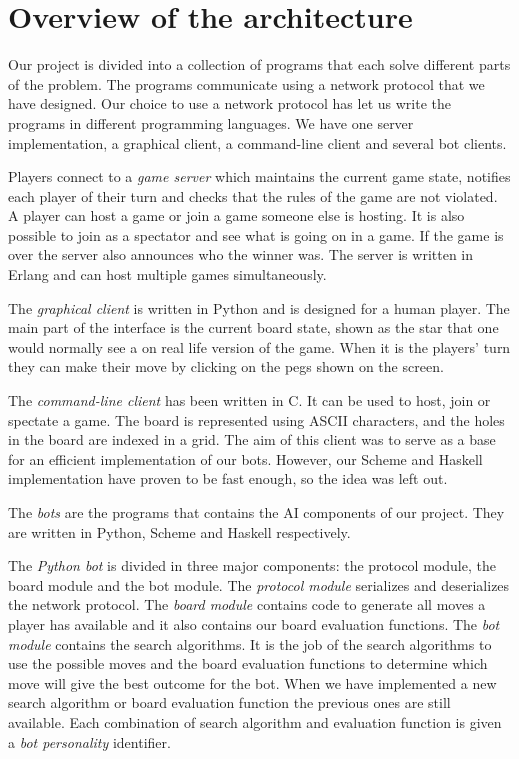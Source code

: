 \section{Overview of the architecture}

Our project is divided into a collection of programs that each solve
different parts of the problem. The programs communicate using a
network protocol that we have designed. Our choice to use a network
protocol has let us write the programs in different programming
languages. We have one server implementation, a graphical client, a
command-line client and several bot clients.

Players connect to a \emph{game server} which maintains the current
game state, notifies each player of their turn and checks that the
rules of the game are not violated. A player can host a game or join a
game someone else is hosting. It is also possible to join as a
spectator and see what is going on in a game. If the game is over the
server also announces who the winner was. The server is written in
Erlang and can host multiple games simultaneously.

The \emph{graphical client} is written in Python and is designed for a
human player. The main part of the interface is the current board
state, shown as the star that one would normally see a on real life
version of the game. When it is the players' turn they can make their
move by clicking on the pegs shown on the screen.

The \emph{command-line client} has been written in C. It can be used to
host, join or spectate a game. The board is represented using ASCII
characters, and the holes in the board are indexed in a grid. The aim
of this client was to serve as a base for an efficient implementation of
our bots. However, our Scheme and Haskell implementation have proven to
be fast enough, so the idea was left out.

The \emph{bots} are the programs that contains the AI components of our
project. They are written in Python, Scheme and Haskell respectively.

The \emph{Python bot} is divided in three major components: the protocol
module, the board module and the bot module. The \emph{protocol module}
serializes and deserializes the network protocol. The \emph{board module}
contains code to generate all moves a player has available and it also
contains our board evaluation functions. The \emph{bot module} contains
the search algorithms. It is the job of the search algorithms to use the
possible moves and the board evaluation functions to determine which move
will give the best outcome for the bot. When we have implemented a new
search algorithm or board evaluation function the previous ones are still
available. Each combination of search algorithm and evaluation function
is given a \emph{bot personality} identifier.

